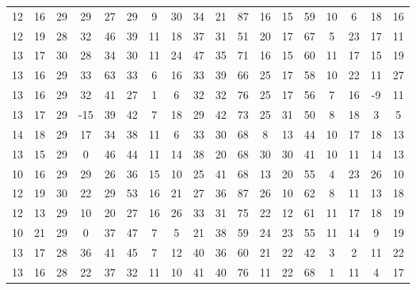 \begin{sidewaystable}
\begin{tabular}{cccccccccccccccccc}
    12    & 16    & 29    & 29    & 27    & 29    & 9     & 30    & 34    & 21     & 87     & 16     & 15     & 59     & 10     & 6      & 18     & 16     \\
    12    & 19    & 28    & 32    & 46    & 39    & 11    & 18    & 37    & 31     & 51     & 20     & 17     & 67     & 5      & 23     & 17     & 11     \\
    13    & 17    & 30    & 28    & 34    & 30    & 11    & 24    & 47    & 35     & 71     & 16     & 15     & 60     & 11     & 17     & 15     & 19     \\
    13    & 16    & 29    & 33    & 63    & 33    & 6     & 16    & 33    & 39     & 66     & 25     & 17     & 58     & 10     & 22     & 11     & 27     \\
    13    & 16    & 29    & 32    & 41    & 27    & 1     & 6     & 32    & 32     & 76     & 25     & 17     & 56     & 7      & 16     & -9     & 11     \\
    13    & 17    & 29    & -15   & 39    & 42    & 7     & 18    & 29    & 42     & 73     & 25     & 31     & 50     & 8      & 18     & 3      & 5      \\
    14    & 18    & 29    & 17    & 34    & 38    & 11    & 6     & 33    & 30     & 68     & 8      & 13     & 44     & 10     & 17     & 18     & 13     \\
    13    & 15    & 29    & 0     & 46    & 44    & 11    & 14    & 38    & 20     & 68     & 30     & 30     & 41     & 10     & 11     & 14     & 13     \\
    10    & 16    & 29    & 29    & 26    & 36    & 15    & 10    & 25    & 41     & 68     & 13     & 20     & 55     & 4      & 23     & 26     & 10     \\
    12    & 19    & 30    & 22    & 29    & 53    & 16    & 21    & 27    & 36     & 87     & 26     & 10     & 62     & 8      & 11     & 13     & 18     \\
    12    & 13    & 29    & 10    & 20    & 27    & 16    & 26    & 33    & 31     & 75     & 22     & 12     & 61     & 11     & 17     & 18     & 19     \\
    10    & 21    & 29    & 0     & 37    & 47    & 7     & 5     & 21    & 38     & 59     & 24     & 23     & 55     & 11     & 14     & 9      & 19     \\
    13    & 17    & 28    & 36    & 41    & 45    & 7     & 12    & 40    & 36     & 60     & 21     & 22     & 42     & 3      & 2      & 11     & 22     \\
    13    & 16    & 28    & 22    & 37    & 32    & 11    & 10    & 41    & 40     & 76     & 11     & 22     & 68     & 1      & 11     & 4      & 17     \\

\end{tabular}
\end{sidewaystable}
